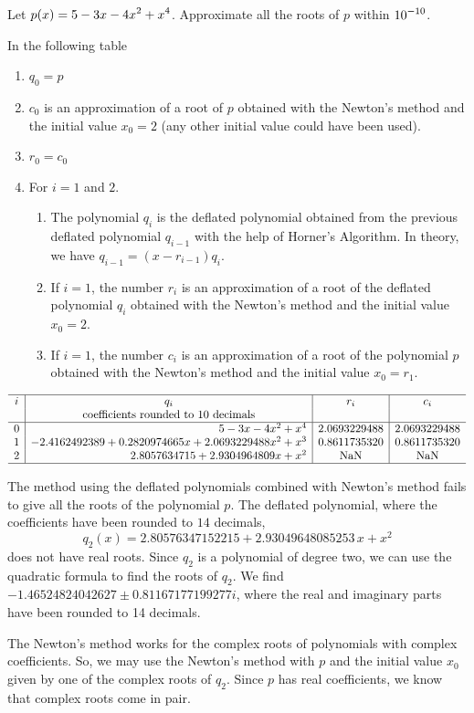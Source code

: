 \begin{egg}
Let $\displaystyle p(x) = 5 -3x -4x^2+x^4$.  Approximate all the roots
of $p$ within $\displaystyle 10^{-10}$.

In the following table
\begin{enumerate}
\item $q_0 = p$
\item $c_0$ is an approximation of a root of $p$ obtained with the
  Newton's method and the initial value $x_0 = 2$ (any other initial
  value could have been used).
\item $r_0 = c_0$
\item For $i=1$ and $2$.
{
\renewcommand{\labelenumii}{(\roman{enumii})}
\begin{enumerate}
\item The polynomial $q_i$ is the deflated polynomial obtained from
  the previous deflated polynomial $q_{i-1}$ with the help of Horner's
  Algorithm.  In theory, we have $q_{i-1} = (x-r_{i-1})q_i$.
\item If $i=1$, the number $r_i$ is an approximation of a root of the
  deflated polynomial $q_i$ obtained with the Newton's method
  and the initial value $x_0 = 2$.
\item If $i=1$, the number $c_i$ is an approximation of a root of the
  polynomial $p$ obtained with the Newton's method and the
  initial value $x_0 = r_1$.
\end{enumerate}
}
\end{enumerate}

\[
\begin{array}{c|r|c|c}
\hline
i & \multicolumn{1}{c|}{q_i} & r_i & c_i \\
& \multicolumn{1}{c|}{\text{coefficients rounded to 10 decimals}} & & \\
\hline
0 & 5 -3 x -4 x^2 +x^4 & 2.0693229488 & 2.0693229488 \\
1 & -2.4162492389 + 0.2820974665 x + 2.0693229488 x^2 +x^3 &
0.8611735320 & 0.8611735320 \\
2 & 2.8057634715 + 2.9304964809 x + x^2 & \text{NaN} & \text{NaN} \\
\hline
\end{array}
\]

The method using the deflated polynomials combined with Newton's method
fails to give all the roots of the polynomial $p$.  The
deflated polynomial, where the coefficients have been rounded to $14$
decimals,
\[
q_2(x) = 2.80576347152215 + 2.93049648085253 \, x + x^2
\]
does not have real roots.  Since $q_2$ is a polynomial of degree two,
we can use the quadratic formula to find the roots of $q_2$.  We find
$-1.46524824042627 \pm 0.81167177199277i$, where the real and
imaginary parts have been rounded to 14 decimals.

The Newton's method works for the complex roots of
polynomials with complex coefficients.  So, we may use the
Newton's method with $p$ and the initial value $x_0$ given by one of the
complex roots of $q_2$.  Since $p$ has real coefficients, we know that
complex roots come in pair.
\end{egg}

